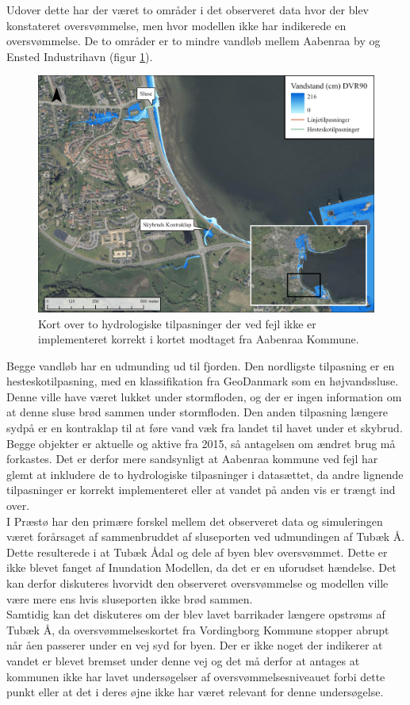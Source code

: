 Udover dette har der været to områder i det observeret data hvor der blev konstateret oversvømmelse, men hvor modellen ikke har indikerede en oversvømmelse. De to områder er to mindre vandløb mellem Aabenraa by og Ensted Industrihavn (figur \ref{Figur: Tilpasnings fejl}). 
\begin{figure}[H]
    \centering
    \includegraphics[width=0.8\linewidth]{images/diskussion/tilpasnings_error.jpg}
    \caption{Kort over to hydrologiske tilpasninger der ved fejl ikke er implementeret korrekt i kortet modtaget fra Aabenraa Kommune.}
    \label{Figur: Tilpasnings fejl}
\end{figure}
Begge vandløb har en udmunding ud til fjorden. Den nordligste tilpasning er en hesteskotilpasning, med en klassifikation fra GeoDanmark som en højvandssluse. Denne ville have været lukket under stormfloden, og der er ingen information om at denne sluse brød sammen under stormfloden. Den anden tilpasning længere sydpå er en kontraklap til at føre vand væk fra landet til havet under et skybrud. Begge objekter er aktuelle og aktive fra 2015, så antagelsen om ændret brug må forkastes. Det er derfor mere sandsynligt at Aabenraa kommune ved fejl har glemt at inkludere de to hydrologiske tilpasninger i datasættet, da andre lignende tilpasninger er korrekt implementeret eller at vandet på anden vis er trængt ind over. \\  

I Præstø har den primære forskel mellem det observeret data og simuleringen været forårsaget af sammenbruddet af sluseporten ved udmundingen af Tubæk Å. Dette resulterede i at Tubæk Ådal og dele af byen blev oversvømmet. Dette er ikke blevet fanget af Inundation Modellen, da det er en uforudset hændelse. Det kan derfor diskuteres hvorvidt den observeret oversvømmelse og modellen ville være mere ens hvis sluseporten ikke brød sammen.\\
Samtidig kan det diskuteres om der blev lavet barrikader længere opstrøms af Tubæk Å, da oversvømmelseskortet fra Vordingborg Kommune stopper abrupt når åen passerer under en vej syd for byen. Der er ikke noget der indikerer at vandet er blevet bremset under denne vej og det må derfor at antages at kommunen ikke har lavet undersøgelser af oversvømmelsesniveauet forbi dette punkt eller at det i deres øjne ikke har været relevant for denne undersøgelse.\\

